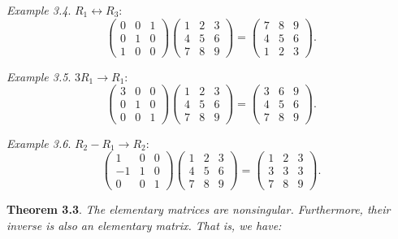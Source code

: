 \documentclass[
  letterpaper,
  DIV=11,
  numbers=noendperiod]{scrartcl}
\theoremstyle{remark}
\begin{document}
\emph{Example 3.4}. \(R_{1}\leftrightarrow R_{3}\):
\[\left(\begin{array}{ccc}0 & 0 & 1\\ 0 & 1 & 0 \\ 1 & 0 & 0\end{array}\right)\left(\begin{array}{ccc}1 & 2 & 3\\ 4 & 5 & 6 \\ 7 & 8 & 9\end{array}\right)
=\left(\begin{array}{ccc}7 & 8 & 9\\ 4 & 5 & 6 \\ 1 & 2 & 3\end{array}\right).\]

\emph{Example 3.5}. \(3R_{1}\rightarrow R_{1}\):
\[\left(\begin{array}{ccc}3 & 0 & 0\\ 0 & 1 & 0 \\ 0 & 0 & 1\end{array}\right)\left(\begin{array}{ccc}1 & 2 & 3\\ 4 & 5 & 6 \\ 7 & 8 & 9\end{array}\right)
=\left(\begin{array}{ccc}3 & 6 & 9\\ 4 & 5 & 6 \\ 7 & 8 & 9\end{array}\right).\]

\emph{Example 3.6}. \(R_{2}-R_{1}\rightarrow R_{2}\):
\[\left(\begin{array}{ccc}1 & 0 & 0\\ -1 & 1 & 0 \\ 0 & 0 & 1\end{array}\right)\left(\begin{array}{ccc}1 & 2 & 3\\ 4 & 5 & 6 \\ 7 & 8 & 9\end{array}\right)
=\left(\begin{array}{ccc}1 & 2 & 3\\ 3 & 3 & 3 \\ 7 & 8 & 9\end{array}\right).\]

\textbf{Theorem 3.3}. \emph{The elementary matrices are nonsingular.
Furthermore, their inverse is also an elementary matrix. That is, we
have:}
\end{document}
